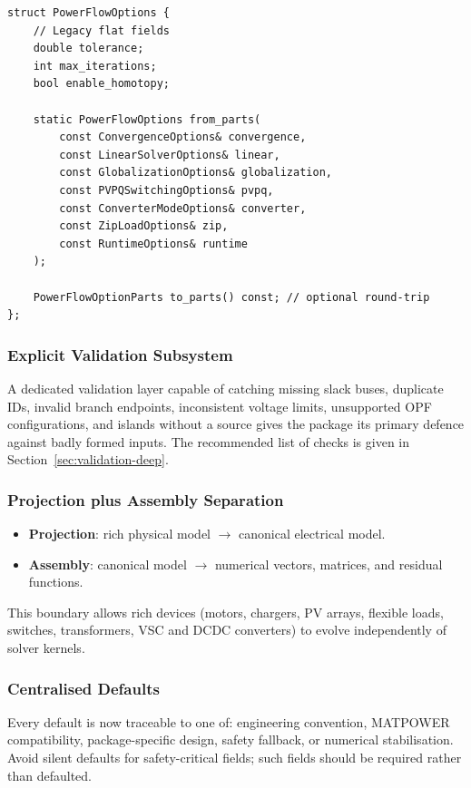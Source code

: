 \begin{verbatim}
struct PowerFlowOptions {
    // Legacy flat fields
    double tolerance;
    int max_iterations;
    bool enable_homotopy;

    static PowerFlowOptions from_parts(
        const ConvergenceOptions& convergence,
        const LinearSolverOptions& linear,
        const GlobalizationOptions& globalization,
        const PVPQSwitchingOptions& pvpq,
        const ConverterModeOptions& converter,
        const ZipLoadOptions& zip,
        const RuntimeOptions& runtime
    );

    PowerFlowOptionParts to_parts() const; // optional round-trip
};
\end{verbatim}

\subsubsection{Explicit Validation Subsystem}

A dedicated validation layer capable of catching missing slack buses,
duplicate IDs, invalid branch endpoints, inconsistent voltage limits,
unsupported OPF configurations, and islands without a source gives the
package its primary defence against badly formed inputs.  The recommended
list of checks is given in Section~\ref{sec:validation-deep}.

\subsubsection{Projection plus Assembly Separation}

\begin{itemize}
  \item \textbf{Projection}: rich physical model $\to$ canonical electrical model.
  \item \textbf{Assembly}: canonical model $\to$ numerical vectors, matrices,
        and residual functions.
\end{itemize}

This boundary allows rich devices (motors, chargers, PV arrays, flexible
loads, switches, transformers, VSC and DCDC converters) to evolve independently
of solver kernels.

\subsubsection{Centralised Defaults}

Every default is now traceable to one of: engineering convention, MATPOWER
compatibility, package-specific design, safety fallback, or numerical
stabilisation.  Avoid silent defaults for safety-critical fields; such fields
should be required rather than defaulted.

